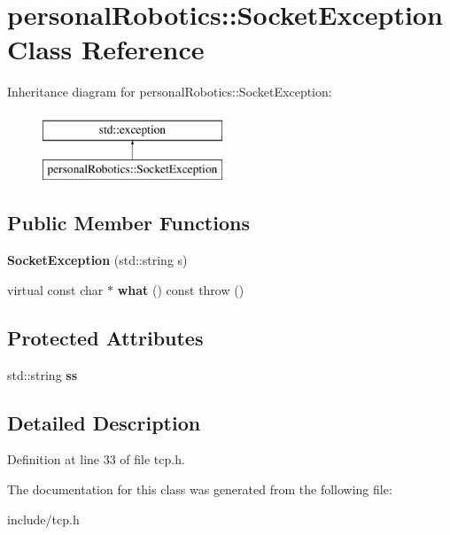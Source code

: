 \hypertarget{classpersonal_robotics_1_1_socket_exception}{}\section{personal\+Robotics\+:\+:Socket\+Exception Class Reference}
\label{classpersonal_robotics_1_1_socket_exception}
Inheritance diagram for personal\+Robotics\+:\+:Socket\+Exception\+:\begin{figure}[H]
\begin{center}
\leavevmode
\includegraphics[height=2.000000cm]{dd/d85/classpersonal_robotics_1_1_socket_exception}
\end{center}
\end{figure}
\subsection*{Public Member Functions}
\begin{DoxyCompactItemize}
\item 
\hypertarget{classpersonal_robotics_1_1_socket_exception_a7714cbb4ad1e421a16096a08a3945662}{}{\bfseries Socket\+Exception} (std\+::string s)\label{classpersonal_robotics_1_1_socket_exception_a7714cbb4ad1e421a16096a08a3945662}

\item 
\hypertarget{classpersonal_robotics_1_1_socket_exception_a4f6f8e89b1fe3cad6d498dd193df36e9}{}virtual const char $\ast$ {\bfseries what} () const   throw ()\label{classpersonal_robotics_1_1_socket_exception_a4f6f8e89b1fe3cad6d498dd193df36e9}

\end{DoxyCompactItemize}
\subsection*{Protected Attributes}
\begin{DoxyCompactItemize}
\item 
\hypertarget{classpersonal_robotics_1_1_socket_exception_ac955f7d5829b88ae3f375368dc7dcc01}{}std\+::string {\bfseries ss}\label{classpersonal_robotics_1_1_socket_exception_ac955f7d5829b88ae3f375368dc7dcc01}

\end{DoxyCompactItemize}


\subsection{Detailed Description}


Definition at line 33 of file tcp.\+h.



The documentation for this class was generated from the following file\+:\begin{DoxyCompactItemize}
\item 
include/tcp.\+h\end{DoxyCompactItemize}
